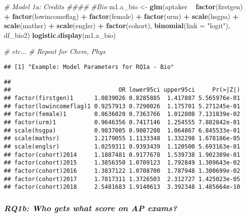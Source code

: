 \documentclass[]{article}
\newenvironment{Shaded}{\begin{snugshade}}{\end{snugshade}}
\newcommand{\KeywordTok}[1]{\textcolor[rgb]{0.13,0.29,0.53}{\textbf{#1}}}
\newcommand{\DataTypeTok}[1]{\textcolor[rgb]{0.13,0.29,0.53}{#1}}
\newcommand{\StringTok}[1]{\textcolor[rgb]{0.31,0.60,0.02}{#1}}
\newcommand{\CommentTok}[1]{\textcolor[rgb]{0.56,0.35,0.01}{\textit{#1}}}
\newcommand{\OperatorTok}[1]{\textcolor[rgb]{0.81,0.36,0.00}{\textbf{#1}}}
\newcommand{\NormalTok}[1]{#1}
\begin{document}
\begin{Shaded}
\begin{Highlighting}[]
\CommentTok{# Model 1a: Credits ####}
\CommentTok{#Bio}
\NormalTok{m1.a_bio <-}\StringTok{ }\KeywordTok{glm}\NormalTok{(aptaker }\OperatorTok{~}\StringTok{ }\KeywordTok{factor}\NormalTok{(firstgen) }\OperatorTok{+}\StringTok{ }\KeywordTok{factor}\NormalTok{(lowincomeflag)  }\OperatorTok{+}\StringTok{ }\KeywordTok{factor}\NormalTok{(female) }\OperatorTok{+}\StringTok{ }\KeywordTok{factor}\NormalTok{(urm) }\OperatorTok{+}
\StringTok{                 }\KeywordTok{scale}\NormalTok{(hsgpa) }\OperatorTok{+}\StringTok{ }\KeywordTok{scale}\NormalTok{(mathsr) }\OperatorTok{+}\StringTok{ }\KeywordTok{scale}\NormalTok{(englsr) }\OperatorTok{+}\StringTok{ }\KeywordTok{factor}\NormalTok{(cohort),}
               \KeywordTok{binomial}\NormalTok{(}\DataTypeTok{link =} \StringTok{"logit"}\NormalTok{), df_bio2)}
\KeywordTok{logistic.display}\NormalTok{(m1.a_bio)}

\CommentTok{# etc...}
\CommentTok{# Repeat for Chem, Phys}
\end{Highlighting}
\end{Shaded}

\begin{verbatim}
## [1] "Example: Model Parameters for RQ1a - Bio"
\end{verbatim}

\begin{verbatim}
##  
##                               OR lower95ci upper95ci     Pr(>|Z|)
## factor(firstgen)1      1.0839026 0.8285885  1.417887 5.565976e-01
## factor(lowincomeflag)1 0.9257913 0.7290026  1.175701 5.271245e-01
## factor(female)1        0.8636020 0.7363766  1.012808 7.131839e-02
## factor(urm)1           0.9646356 0.7417146  1.254555 7.882842e-01
## scale(hsgpa)           0.9837005 0.9087208  1.064867 6.845533e-01
## scale(mathsr)          1.2179055 1.1133348  1.332298 1.678186e-05
## scale(englsr)          1.0259311 0.9393439  1.120500 5.693163e-01
## factor(cohort)2014     1.1887481 0.9177678  1.539738 1.902389e-01
## factor(cohort)2015     1.3856350 1.0709123  1.792849 1.309643e-02
## factor(cohort)2016     1.3837122 1.0708700  1.787948 1.300699e-02
## factor(cohort)2017     1.7817311 1.3726503  2.312727 1.425023e-05
## factor(cohort)2018     2.5481683 1.9140613  3.392348 1.485664e-10
\end{verbatim}

\subsubsection{\texorpdfstring{\emph{RQ1b: Who gets what score on AP
exams?}}{RQ1b: Who gets what score on AP exams?}}\label{rq1b-who-gets-what-score-on-ap-exams}
\end{document}

